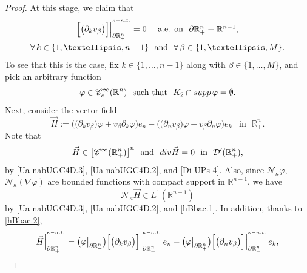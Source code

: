 \documentclass[10pt,a4paper]{amsart}
\begin{document}
\begin{proof}
At this stage, we claim that 
%
\begin{equation}\label{Ua-nabUGC4D}
\begin{array}{c}
\Big[\big(\partial_k v_\beta\big)\Big]
\Big|_{\partial\mathbb{R}^{n}_{+}}^{{}^{\kappa-{\rm n.t.}}}=0
\quad\text{ a.e. on }\,\,\partial{\mathbb{R}}^n_{+}\equiv\mathbb{R}^{n-1},
\\[10pt]
\forall\,k\in\{1,\dots,n-1\}\,\,\text{ and }\,\,\forall\,\beta\in\{1,\dots,M\}.
\end{array}
\end{equation}
%
To see that this is the case, fix $k\in\{1,\dots,n-1\}$ along with 
$\beta\in\{1,\dots,M\}$, and pick an arbitrary function 
%
\begin{equation}\label{Ua-nabUGC4D.2}
\varphi\in{\mathscr{C}}^\infty_c({\mathbb{R}}^n)\,\,\text{ such that }\,\,
K_2\cap{\rm supp}\,\varphi=\emptyset. 
\end{equation}
%
Next, consider the vector field
%
\begin{equation}\label{Ua-nabUGC4D.3}
\vec{H}:=\Big(\big(\partial_k v_\beta\big)\varphi+v_\beta\partial_k\varphi\Big)e_n
-\Big(\big(\partial_n v_{\beta}\big)\varphi+v_{\beta}\partial_n\varphi\Big)e_k
\,\,\,\text{ in }\,\,{\mathbb{R}}^n_{+}.
\end{equation}
%
Note that 
%
\begin{equation}\label{Ua-nabUGC4D.4}
\vec{H}\in\big[{\mathscr{C}}^\infty({\mathbb{R}}^n_{+})\big]^n\,\,\text{ and }\,\,
{\rm div}\vec{H}=0\,\,\text{ in }\,\,{\mathcal{D}}'({\mathbb{R}}^n_{+}),
\end{equation}
%
by \eqref{Ua-nabUGC4D.3}, \eqref{Ua-nabUGC4D.2}, and \eqref{Di-UPs-4}. 
Also, since ${\mathcal{N}}_{\kappa}\varphi$, ${\mathcal{N}}_{\kappa}(\nabla\varphi)$ 
are bounded functions with compact support in ${\mathbb{R}}^{n-1}$, we have
%
\begin{equation}\label{Ua-nabUGC4D.5}
{\mathcal{N}}_{\kappa}\vec{H}\in L^1({\mathbb{R}}^{n-1})
\end{equation}
%
by \eqref{Ua-nabUGC4D.3}, \eqref{Ua-nabUGC4D.2}, and \eqref{hBbac.1}.
In addition, thanks to \eqref{hBbac.2}, 
%
\begin{equation}\label{Ua-nabUGC4D.6}
\vec{H}\Big|_{\partial\mathbb{R}^{n}_{+}}^{{}^{\kappa-{\rm n.t.}}}
=\big(\varphi\big|_{\partial\mathbb{R}^{n}_{+}}\big)
\Big[\big(\partial_k v_{\beta}\big)\Big]
\Big|_{\partial\mathbb{R}^{n}_{+}}^{{}^{\kappa-{\rm n.t.}}}\,e_n
-\big(\varphi\big|_{\partial\mathbb{R}^{n}_{+}}\big)
\Big[\big(\partial_n v_{\beta}\big)\Big]
\Big|_{\partial\mathbb{R}^{n}_{+}}^{{}^{\kappa-{\rm n.t.}}}\,e_k,

\end{equation}
\end{proof}
\end{document}
